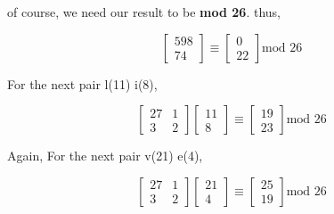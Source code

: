 \documentclass[a4paper,12pt]{article}
\begin{document}
    of course, we need our result to be {\bf mod 26}. thus,

    \begin{equation*}
        \begin{bmatrix}
            598 \\
            74
        \end{bmatrix} \equiv \begin{bmatrix}
            0 \\
            22
        \end{bmatrix} \mbox{mod 26}
    \end{equation*}

    \begin{center}
    \end{center}
    
    For the next pair l(11) i(8),

    \begin{equation*}
        \begin{bmatrix}
            27 & 1 \\
            3 & 2
        \end{bmatrix}
        \begin{bmatrix}
            11 \\
            8
        \end{bmatrix} \equiv \begin{bmatrix}
            19 \\
            23
        \end{bmatrix} \mbox{mod 26}
    \end{equation*}

    \begin{center}
    \end{center}

    Again, For the next pair v(21) e(4),

    \begin{equation*}
        \begin{bmatrix}
            27 & 1 \\
            3 & 2
        \end{bmatrix}
        \begin{bmatrix}
            21 \\
            4
        \end{bmatrix} \equiv \begin{bmatrix}
            25 \\
            19
        \end{bmatrix} \mbox{mod 26}
    \end{equation*}
\end{document}

